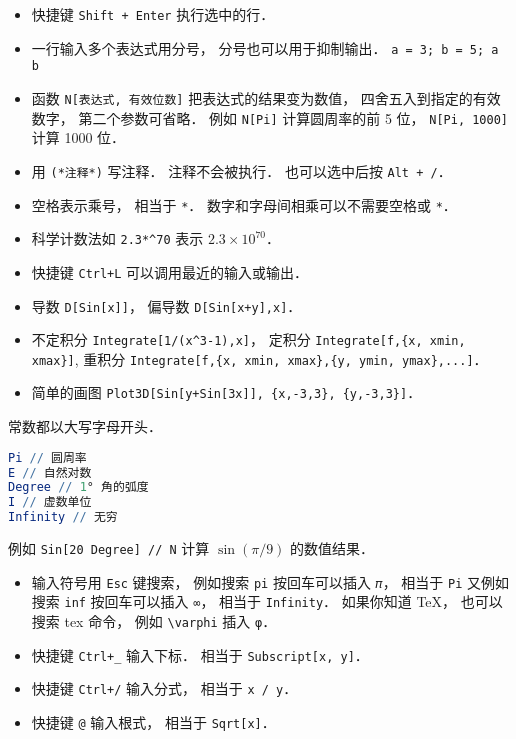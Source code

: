 
\begin{issues}
\issueDraft
\end{issues}


\begin{itemize}
\item 快捷键 \verb|Shift + Enter| 执行选中的行．
\item 一行输入多个表达式用分号， 分号也可以用于抑制输出． \verb|a = 3; b = 5; a b|
\item 函数 \verb|N[表达式, 有效位数]| 把表达式的结果变为数值， 四舍五入到指定的有效数字， 第二个参数可省略． 例如 \verb|N[Pi]| 计算圆周率的前 5 位， \verb|N[Pi, 1000]| 计算 1000 位．
\item 用 \verb|(*注释*)| 写注释． 注释不会被执行． 也可以选中后按 \verb|Alt + /|．
\item 空格表示乘号， 相当于 \verb|*|． 数字和字母间相乘可以不需要空格或 \verb|*|．
\item 科学计数法如 \verb|2.3*^70| 表示 $2.3\times 10^{70}$．
\item 快捷键 \verb|Ctrl+L| 可以调用最近的输入或输出．
\item 导数 \verb|D[Sin[x]]|， 偏导数 \verb|D[Sin[x+y],x]|．
\item 不定积分 \verb|Integrate[1/(x^3-1),x]|， 定积分 \verb|Integrate[f,{x, xmin, xmax}]|, 重积分 \verb|Integrate[f,{x, xmin, xmax},{y, ymin, ymax},...]|．
\item 简单的画图 \verb|Plot3D[Sin[y+Sin[3x]], {x,-3,3}, {y,-3,3}]|．
\end{itemize}

常数都以大写字母开头．
\begin{lstlisting}[language=Mathematica]
Pi // 圆周率
E // 自然对数
Degree // 1° 角的弧度
I // 虚数单位
Infinity // 无穷
\end{lstlisting}
例如 \verb|Sin[20 Degree] // N| 计算 $\sin(\pi/9)$ 的数值结果．

\begin{itemize}
\item 输入符号用 \verb|Esc| 键搜索， 例如搜索 \verb|pi| 按回车可以插入 \verb|𝜋|， 相当于 \verb|Pi| 又例如搜索 \verb|inf| 按回车可以插入 \verb|∞|， 相当于 \verb|Infinity|． 如果你知道 TeX， 也可以搜索 tex 命令， 例如 \verb|\varphi| 插入 \verb|φ|．
\item 快捷键 \verb|Ctrl+_| 输入下标． 相当于 \verb|Subscript[x, y]|．
\item 快捷键 \verb|Ctrl+/| 输入分式， 相当于 \verb|x / y|．
\item 快捷键 \verb|@| 输入根式， 相当于 \verb|Sqrt[x]|．
\end{itemize}


